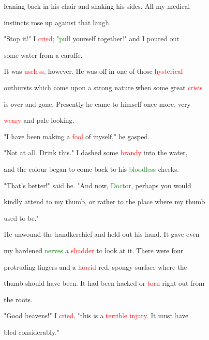  leaning back in his chair and shaking his sides. All my \textcolor{BurntOrange}{medical}

 instincts rose up against that \textcolor{BurntOrange}{laugh.}



 "Stop it!" I \textcolor{red}{cried;} \textcolor{green}{"pull} yourself together!" and I poured out

 some water from a caraffe.



 It was \textcolor{red}{useless,} however. He was off in one of those \textcolor{red}{hysterical}

 \textcolor{BurntOrange}{outbursts} which come upon a strong nature when some great \textcolor{red}{crisis}

 is over and gone. Presently he came to himself once more, very

 \textcolor{red}{weary} and pale-looking.



 "I have been making a \textcolor{red}{fool} of myself," he gasped.



 "Not at all. Drink this." I dashed some \textcolor{red}{brandy} into the water,

 and the colour began to come back to his \textcolor{green}{bloodless} cheeks.



 "That's better!" said he. "And now, \textcolor{green}{Doctor,} perhaps you would

 kindly attend to my thumb, or rather to the place where my thumb

 used to be."



 He unwound the handkerchief and held out his hand. It gave even

 my hardened \textcolor{green}{nerves} a \textcolor{red}{shudder} to look at it. There were four

 protruding fingers and a \textcolor{red}{horrid} red, spongy surface where the

 thumb should have been. It had been hacked or \textcolor{red}{torn} right out from

 the roots.



 \textcolor{BurntOrange}{"Good} heavens!" I \textcolor{red}{cried,} "this is a \textcolor{red}{terrible} \textcolor{red}{injury.} It must have

 bled considerably."



